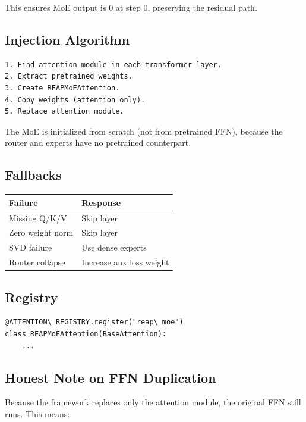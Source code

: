 This ensures MoE output is 0 at step 0, preserving the residual path.

\subsection{Injection Algorithm}

\begin{lstlisting}
1. Find attention module in each transformer layer.
2. Extract pretrained weights.
3. Create REAPMoEAttention.
4. Copy weights (attention only).
5. Replace attention module.
\end{lstlisting}

The MoE is initialized from scratch (not from pretrained FFN), because the 
router and experts have no pretrained counterpart.

\subsection{Fallbacks}

\begin{table}[H]
\centering
\small
\begin{tabular}{ll}
\toprule
\textbf{Failure} & \textbf{Response} \\
\midrule
Missing Q/K/V & Skip layer \\
Zero weight norm & Skip layer \\
SVD failure & Use dense experts \\
Router collapse & Increase aux loss weight \\
\bottomrule
\end{tabular}
\end{table}

\subsection{Registry}

\begin{lstlisting}
@ATTENTION\_REGISTRY.register("reap\_moe")
class REAPMoEAttention(BaseAttention):
    ...
\end{lstlisting}

\subsection{Honest Note on FFN Duplication}

Because the framework replaces only the attention module, the original FFN 
still runs. This means:

